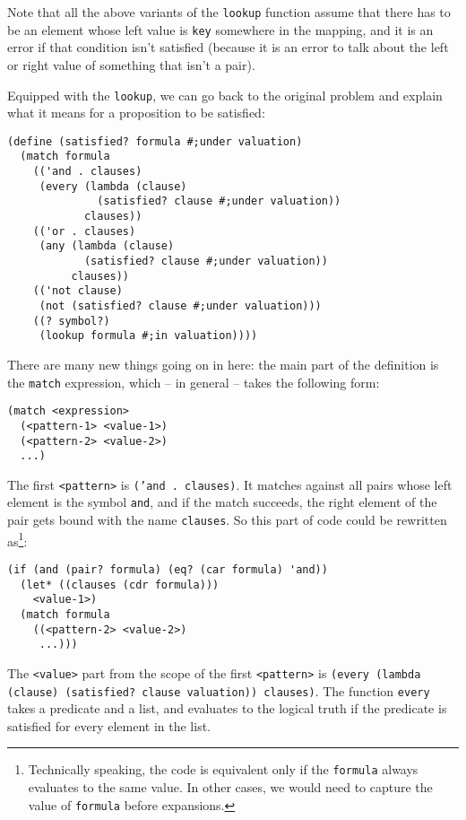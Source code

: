 Note that all the above variants of the \texttt{lookup}
function assume that there has to be an element whose
left value is \texttt{key} somewhere in the mapping,
and it is an error if that condition isn't satisfied
(because it is an error to talk about the left or right
value of something that isn't a pair).

Equipped with the \texttt{lookup}, we can go back
to the original problem and explain what it means
for a proposition to be satisfied:

\begin{Verbatim}[samepage=true]
(define (satisfied? formula #;under valuation)
  (match formula
    (('and . clauses)
     (every (lambda (clause)
              (satisfied? clause #;under valuation))
            clauses))
    (('or . clauses)
     (any (lambda (clause)
            (satisfied? clause #;under valuation))
          clauses))
    (('not clause)
     (not (satisfied? clause #;under valuation)))
    ((? symbol?)
     (lookup formula #;in valuation))))
\end{Verbatim}

There are many new things going on in here: the
main part of the definition is the \texttt{match}
expression, which -- in general -- takes the following
form:

\begin{Verbatim}[samepage=true]
(match <expression> 
  (<pattern-1> <value-1>) 
  (<pattern-2> <value-2>)
  ...)
\end{Verbatim}

The first \texttt{<pattern>} is \texttt{('and . clauses)}.
It matches against all pairs whose left element is the symbol
\texttt{and}, and if the match succeeds, the right element
of the pair gets bound with the name \texttt{clauses}.
So this part of code could be rewritten as\footnote{Technically
speaking, the code is equivalent only if the \texttt{formula}
always evaluates to the same value. In other cases, we would
need to capture the value of \texttt{formula} before expansions.}:
\begin{Verbatim}[samepage=true]
(if (and (pair? formula) (eq? (car formula) 'and))
  (let* ((clauses (cdr formula)))
    <value-1>)
  (match formula
    ((<pattern-2> <value-2>)
     ...)))
\end{Verbatim}

The \texttt{<value>} part from the scope of the first
\texttt{<pattern>} is
\texttt{(every (lambda (clause) (satisfied? clause valuation)) clauses)}.
The function \texttt{every} takes a predicate and a list, and
evaluates to the logical truth if the predicate is satisfied
for every element in the list.

